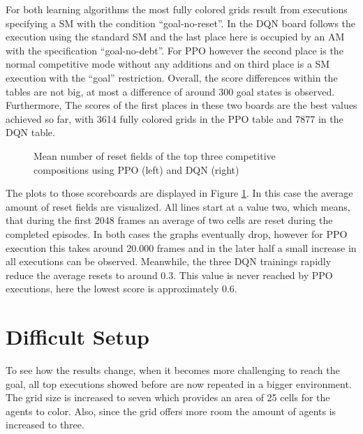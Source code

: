 For both learning algorithms the most fully colored grids result from executions specifying a SM with the condition ``goal-no-reset''. In the DQN board follows the execution using the standard SM and the last place here is occupied by an AM with the specification ``goal-no-debt''. For PPO however the second place is the normal competitive mode without any additions and on third place is a SM execution with the ``goal'' restriction. Overall, the score differences within the tables are not big, at most a difference of around 300 goal states is observed. Furthermore, The scores of the first places in these two boards are the best values achieved so far, with 3614 fully colored grids in the PPO table and 7877 in the DQN table.

\begin{figure}[hpbt]
    \centering
    \hspace{0.01\textwidth}
    \caption[Mean Number of Reset Fields of the Top Competitive Modes in a 5x5 Environment]{Mean number of reset fields of the top three competitive compositions using PPO (left) and DQN (right)}
    \label{fig:multipic_plots_comp_easy}
\end{figure}

The plots to those scoreboards are displayed in Figure \ref{fig:multipic_plots_comp_easy}. In this case the average amount of reset fields are visualized. All lines start at a value two, which means, that during the first 2048 frames an average of two cells are reset during the completed episodes. In both cases the graphs eventually drop, however for PPO execution this takes around 20.000 frames and in the later half a small increase in all executions can be observed. Meanwhile, the three DQN trainings rapidly reduce the average resets to around 0.3. This value is never reached by PPO executions, here the lowest score is approximately 0.6.

\section{Difficult Setup} \label{difficult_env}
To see how the results change, when it becomes more challenging to reach the goal, all top executions showed before are now repeated in a bigger environment. The grid size is increased to seven which provides an area of 25 cells for the agents to color. Also, since the grid offers more room the amount of agents is increased to three.

